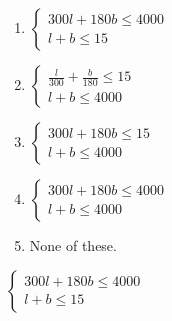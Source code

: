 \ifactodd
	\begin{enumerate}[label=\textbf{\Alph*.},itemsep=\fill,align=left]
		\item $\left\lbrace
 \begin{array}{l} 
 300l+180b\leq 4000\\ 
 l+b\leq 15 
 \end{array}
 \right.  $ %
		\item $\left\lbrace
 \begin{array}{l}
 \frac{l}{300}+\frac{b}{180}\leq 15\\
 l+b\leq 4000
 \end{array}\right. $ 
		\item $\left\lbrace
 \begin{array}{l}
 300l+180b\leq 15\\
 l+b\leq 4000
 \end{array}\right. $ 
		\item $\left\lbrace
 \begin{array}{l}
 300l+180b\leq 4000\\
 l+b\leq 4000
 \end{array}\right. $
		\item None of these. 
	\end{enumerate}
\else
\fi

\ifgridin
 $\left\lbrace
 \begin{array}{l} 
 300l+180b\leq 4000\\ 
 l+b\leq 15 
 \end{array}
 \right.  $ %
		
\else
\fi

